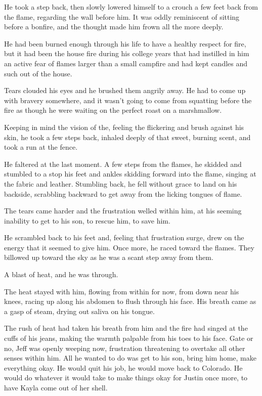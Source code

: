 He took a step back, then slowly lowered himself to a crouch a few feet back from the flame, regarding the wall before him.  It was oddly reminiscent of sitting before a bonfire, and the thought made him frown all the more deeply.

He had been burned enough through his life to have a healthy respect for fire, but it had been the house fire during his college years that had instilled in him an active fear of flames larger than a small campfire and had kept candles and such out of the house.

Tears clouded his eyes and he brushed them angrily away.  He had to come up with bravery somewhere, and it wasn't going to come from squatting before the fire as though he were waiting on the perfect roast on a marshmallow.

Keeping in mind the vision of the, feeling the flickering and brush against his skin, he took a few steps back, inhaled deeply of that sweet, burning scent, and took a run at the fence.

He faltered at the last moment.  A few steps from the flames, he skidded and stumbled to a stop his feet and ankles skidding forward into the flame, singing at the fabric and leather.  Stumbling back, he fell without grace to land on his backside, scrabbling backward to get away from the licking tongues of flame.

The tears came harder and the frustration welled within him, at his seeming inability to get to his son, to rescue him, to save him.

He scrambled back to his feet and, feeling that frustration surge, drew on the energy that it seemed to give him.  Once more, he raced toward the flames.  They billowed up toward the sky as he was a scant step away from them.

A blast of heat, and he was through.

The heat stayed with him, flowing from within for now, from down near his knees, racing up along his abdomen to flush through his face.  His breath came as a gasp of steam, drying out saliva on his tongue.

\secdiv

The rush of heat had taken his breath from him and the fire had singed at the cuffs of his jeans, making the warmth palpable from his toes to his face.  Gate or no, Jeff was openly weeping now, frustration threatening to overtake all other senses within him.  All he wanted to do was get to his son, bring him home, make everything okay.  He would quit his job, he would move back to Colorado.  He would do whatever it would take to make things okay for Justin once more, to have Kayla come out of her shell.

